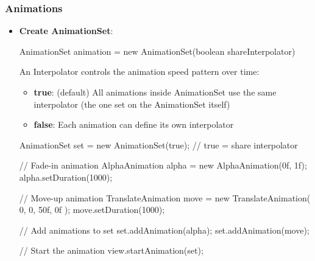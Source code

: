 \documentclass{report}
\begin{document}
    \subsubsection{Animations}
    \begin{itemize}
        \item \textbf{Create AnimationSet}:
            \bigbreak \noindent 
            \begin{javacode}
            AnimationSet animation = new AnimationSet(boolean shareInterpolator)
            \end{javacode}
            \bigbreak \noindent 
            An Interpolator controls the animation speed pattern over time:
            \begin{itemize}
                \item \textbf{true}: (default)	All animations inside AnimationSet use the same interpolator (the one set on the AnimationSet itself)
                \item \textbf{false}:	Each animation can define its own interpolator
            \end{itemize}
            \bigbreak \noindent 
            \begin{javacode}
                AnimationSet set = new AnimationSet(true); // true = share interpolator

                // Fade-in animation
                AlphaAnimation alpha = new AlphaAnimation(0f, 1f);
                alpha.setDuration(1000);

                // Move-up animation
                TranslateAnimation move = new TranslateAnimation(
                0, 0,
                50f, 0f
                );
                move.setDuration(1000);

                // Add animations to set
                set.addAnimation(alpha);
                set.addAnimation(move);

                // Start the animation
                view.startAnimation(set);
            \end{javacode}
    \end{itemize}

    \pagebreak 
\end{document}
